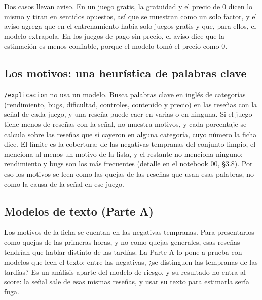 Dos casos llevan aviso. En un juego gratis, la gratuidad y el precio de 0 dicen lo mismo y tiran en
sentidos opuestos, así que se muestran como un solo factor, y el aviso agrega que en el
entrenamiento había solo \cifraGratisEntrenamiento{} juegos gratis y que, para ellos, el modelo
extrapola. En los \cifraPagoSinPrecioEntrenamiento{} juegos de pago sin precio, el aviso dice que
la estimación es menos confiable, porque el modelo tomó el precio como 0.

\subsection{Los motivos: una heurística de palabras clave}\label{sec:interpretabilidad-motivos}

\texttt{/explicacion} no usa un modelo. Busca palabras clave en inglés de \cifraCategoriasMotivos{}
categorías (rendimiento, bugs, dificultad, controles, contenido y precio) en las reseñas con la
señal de cada juego, y una reseña puede caer en varias o en ninguna. Si el juego tiene menos de
\cifraUmbralMinCasos{} reseñas con la señal, no muestra motivos, y cada porcentaje se calcula sobre
las reseñas que sí cayeron en alguna categoría, cuyo número la ficha dice. El límite es la
cobertura: de las \cifraNegativasTempranasLimpias{} negativas tempranas del conjunto limpio, el
\cifraCoberturaMotivosPorResena{} menciona al menos un motivo de la lista, y el
\cifraSinMotivoPorResena{} restante no menciona ninguno; rendimiento y bugs son los más frecuentes
(detalle en el notebook 00, §3.8). Por eso los motivos se leen como las quejas de las reseñas que
usan esas palabras, no como la causa de la señal en ese juego.

\subsection{Modelos de texto (Parte A)}\label{sec:modelacion-texto}

Los motivos de la ficha se cuentan en las negativas tempranas. Para presentarlos como quejas de las
primeras horas, y no como quejas generales, esas reseñas tendrían que hablar distinto de las
tardías. La Parte A lo pone a prueba con modelos que leen el texto: entre las negativas, ¿se
distinguen las tempranas de las tardías? Es un análisis aparte del modelo de
riesgo, y su resultado no entra al score: la señal sale de esas mismas reseñas, y usar su texto
para estimarla sería fuga.

